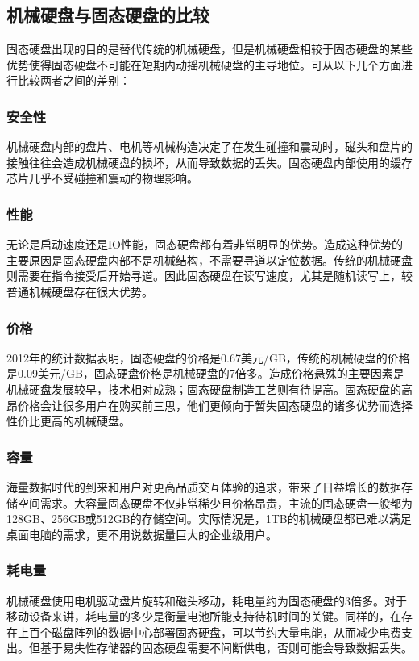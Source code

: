 \subsection{机械硬盘与固态硬盘的比较}
固态硬盘出现的目的是替代传统的机械硬盘，但是机械硬盘相较于固态硬盘的某些优势使得固态硬盘不可能在短期内动摇机械硬盘的主导地位。可从以下几个方面进行比较两者之间的差别：

\subsubsection{安全性}
机械硬盘内部的盘片、电机等机械构造决定了在发生碰撞和震动时，磁头和盘片的接触往往会造成机械硬盘的损坏，从而导致数据的丢失。固态硬盘内部使用的缓存芯片几乎不受碰撞和震动的物理影响。

\subsubsection{性能}
无论是启动速度还是IO性能，固态硬盘都有着非常明显的优势。造成这种优势的主要原因是固态硬盘内部不是机械结构，不需要寻道以定位数据。传统的机械硬盘则需要在指令接受后开始寻道。因此固态硬盘在读写速度，尤其是随机读写上，较普通机械硬盘存在很大优势。

\subsubsection{价格}
2012年的统计数据表明，固态硬盘的价格是0.67美元/GB，传统的机械硬盘的价格是0.09美元/GB，固态硬盘价格是机械硬盘的7倍多。造成价格悬殊的主要因素是机械硬盘发展较早，技术相对成熟；固态硬盘制造工艺则有待提高。固态硬盘的高昂价格会让很多用户在购买前三思，他们更倾向于暂失固态硬盘的诸多优势而选择性价比更高的机械硬盘。

\subsubsection{容量}
海量数据时代的到来和用户对更高品质交互体验的追求，带来了日益增长的数据存储空间需求。大容量固态硬盘不仅非常稀少且价格昂贵，主流的固态硬盘一般都为128GB、256GB或512GB的存储空间。实际情况是，1TB的机械硬盘都已难以满足桌面电脑的需求，更不用说数据量巨大的企业级用户。

\subsubsection{耗电量}
机械硬盘使用电机驱动盘片旋转和磁头移动，耗电量约为固态硬盘的3倍多。对于移动设备来讲，耗电量的多少是衡量电池所能支持待机时间的关键。同样的，在存在上百个磁盘阵列的数据中心部署固态硬盘，可以节约大量电能，从而减少电费支出。但基于易失性存储器的固态硬盘需要不间断供电，否则可能会导致数据丢失。


